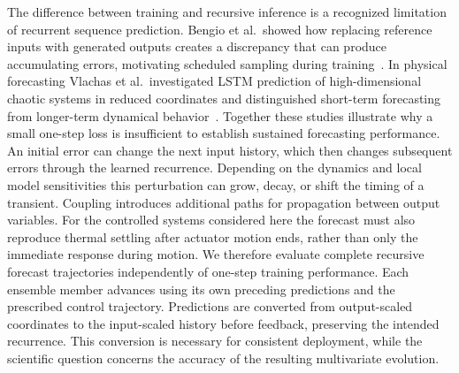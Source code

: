 The difference between training and recursive inference is a recognized limitation of recurrent sequence prediction. Bengio et al.\ showed how replacing reference inputs with generated outputs creates a discrepancy that can produce accumulating errors, motivating scheduled sampling during training~\cite{bengio2015scheduled}. In physical forecasting Vlachas et al.\ investigated LSTM prediction of high-dimensional chaotic systems in reduced coordinates and distinguished short-term forecasting from longer-term dynamical behavior~\cite{vlachas2018chaotic}. Together these studies illustrate why a small one-step loss is insufficient to establish sustained forecasting performance. An initial error can change the next input history, which then changes subsequent errors through the learned recurrence. Depending on the dynamics and local model sensitivities this perturbation can grow, decay, or shift the timing of a transient. Coupling introduces additional paths for propagation between output variables. For the controlled systems considered here the forecast must also reproduce thermal settling after actuator motion ends, rather than only the immediate response during motion. We therefore evaluate complete recursive forecast trajectories independently of one-step training performance. Each ensemble member advances using its own preceding predictions and the prescribed control trajectory. Predictions are converted from output-scaled coordinates to the input-scaled history before feedback, preserving the intended recurrence. This conversion is necessary for consistent deployment, while the scientific question concerns the accuracy of the resulting multivariate evolution.

